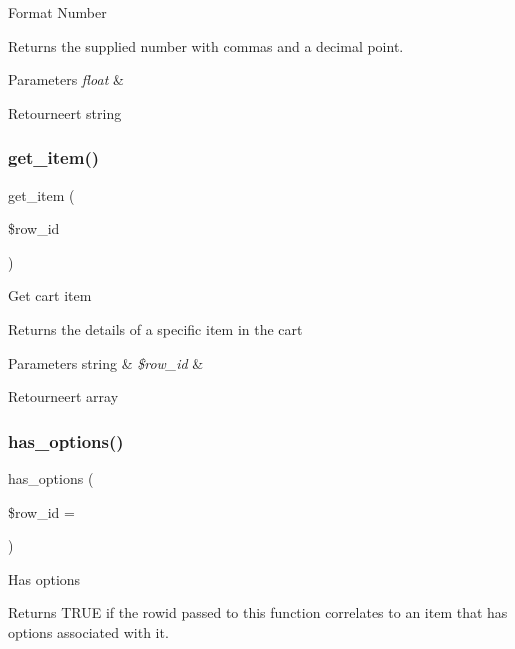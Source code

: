 Format Number

Returns the supplied number with commas and a decimal point.


\begin{DoxyParams}{Parameters}
{\em float} & \\
\hline
\end{DoxyParams}
\begin{DoxyReturn}{Retourneert}
string 
\end{DoxyReturn}
\mbox{\label{class_c_i___cart_a73841dfae18a2719c7eb6d31978067a9}} 
\subsubsection{\texorpdfstring{get\_item()}{get\_item()}}
{\footnotesize\ttfamily get\+\_\+item (\begin{DoxyParamCaption}\item[{}]{\$row\+\_\+id }\end{DoxyParamCaption})}

Get cart item

Returns the details of a specific item in the cart


\begin{DoxyParams}[1]{Parameters}
string & {\em \$row\+\_\+id} & \\
\hline
\end{DoxyParams}
\begin{DoxyReturn}{Retourneert}
array 
\end{DoxyReturn}
\mbox{\label{class_c_i___cart_a276cedf02c823357a2b643a13806f2be}} 
\subsubsection{\texorpdfstring{has\_options()}{has\_options()}}
{\footnotesize\ttfamily has\+\_\+options (\begin{DoxyParamCaption}\item[{}]{\$row\+\_\+id = {\ttfamily \textquotesingle{}\textquotesingle{}} }\end{DoxyParamCaption})}

Has options

Returns T\+R\+UE if the rowid passed to this function correlates to an item that has options associated with it.


